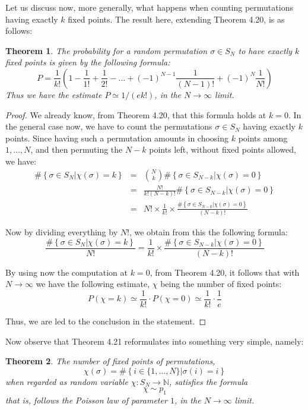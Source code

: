 \documentclass[12pt]{amsbook}
\newtheorem{theorem}{Theorem}[chapter]
\begin{document}
Let us discuss now, more generally, what happens when counting permutations having exactly $k$ fixed points. The result here, extending Theorem 4.20, is as follows:

\begin{theorem}
The probability for a random permutation $\sigma\in S_N$ to have exactly $k$ fixed points is given by the following formula:
$$P=\frac{1}{k!}\left(1-\frac{1}{1!}+\frac{1}{2!}-\ldots+(-1)^{N-1}\frac{1}{(N-1)!}+(-1)^N\frac{1}{N!}\right)$$
Thus we have the estimate $P\simeq1/(ek!)$, in the $N\to\infty$ limit.
\end{theorem}

\begin{proof}
We already know, from Theorem 4.20, that this formula holds at $k=0$. In the general case now, we have to count the permutations $\sigma\in S_N$ having exactly $k$ points. Since having such a permutation amounts in choosing $k$ points among $1,\ldots,N$, and then permuting the $N-k$ points left, without fixed points allowed, we have:
\begin{eqnarray*}
\#\left\{\sigma\in S_N\Big|\chi(\sigma)=k\right\}
&=&\binom{N}{k}\#\left\{\sigma\in S_{N-k}\Big|\chi(\sigma)=0\right\}\\
&=&\frac{N!}{k!(N-k)!}\#\left\{\sigma\in S_{N-k}\Big|\chi(\sigma)=0\right\}\\
&=&N!\times\frac{1}{k!}\times\frac{\#\left\{\sigma\in S_{N-k}\Big|\chi(\sigma)=0\right\}}{(N-k)!}
\end{eqnarray*}

Now by dividing everything by $N!$, we obtain from this the following formula:
$$\frac{\#\left\{\sigma\in S_N\Big|\chi(\sigma)=k\right\}}{N!}=\frac{1}{k!}\times\frac{\#\left\{\sigma\in S_{N-k}\Big|\chi(\sigma)=0\right\}}{(N-k)!}$$

By using now the computation at $k=0$, from Theorem 4.20, it follows that with $N\to\infty$ we have the following estimate, $\chi$ being the number of fixed points:
$$P(\chi=k)
\simeq\frac{1}{k!}\cdot P(\chi=0)
\simeq\frac{1}{k!}\cdot\frac{1}{e}$$

Thus, we are led to the conclusion in the statement.
\end{proof}

Now observe that Theorem 4.21 reformulates into something very simple, namely:

\begin{theorem}
The number of fixed points of permutations,
$$\chi(\sigma)=\#\left\{i\in\{1,\ldots,N\}\Big|\sigma(i)=i\right\}$$ 
when regarded as random variable $\chi:S_N\to\mathbb N$, satisfies the formula
$$\chi\sim p_1$$
that is, follows the Poisson law of parameter $1$, in the $N\to\infty$ limit.
\end{theorem}
\end{document}

